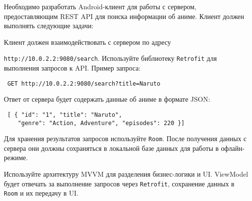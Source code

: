 
Необходимо разработать Android-клиент для работы с сервером, предоставляющим REST API для поиска информации об аниме. Клиент должен выполнять следующие задачи:


Клиент должен взаимодействовать с сервером по адресу 

\texttt{http://10.0.2.2:9080/search}. Используйте библиотеку \texttt{Retrofit} для выполнения запросов к API. Пример запроса:

\begin{verbatim} GET http://10.0.2.2:9080/search?title=Naruto \end{verbatim}

Ответ от сервера будет содержать данные об аниме в формате JSON:

\begin{verbatim} [ { "id": "1", "title": "Naruto", 
    "genre": "Action, Adventure", "episodes": 220 }] \end{verbatim}


Для хранения результатов запросов используйте \texttt{Room}. После получения данных с сервера они должны сохраняться в локальной базе данных для работы в офлайн-режиме.


Используйте архитектуру MVVM для разделения бизнес-логики и UI. ViewModel будет отвечать за выполнение запросов через \texttt{Retrofit}, сохранение данных в \texttt{Room} и их передачу в UI.


